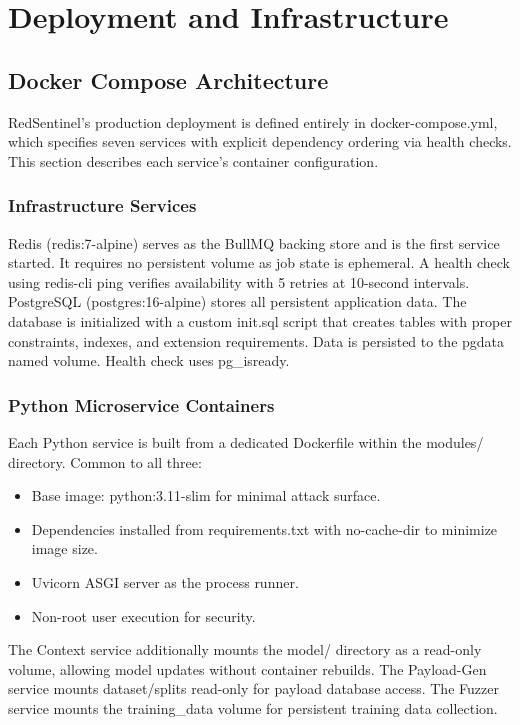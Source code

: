 \chapter{Deployment and Infrastructure}

\section{Docker Compose Architecture}
RedSentinel's production deployment is defined entirely in docker-compose.yml, which specifies seven services with explicit dependency ordering via health checks. This section describes each service's container configuration.
\subsection{Infrastructure Services}
Redis (redis:7-alpine) serves as the BullMQ backing store and is the first service started. It requires no persistent volume as job state is ephemeral. A health check using redis-cli ping verifies availability with 5 retries at 10-second intervals. PostgreSQL (postgres:16-alpine) stores all persistent application data. The database is initialized with a custom init.sql script that creates tables with proper constraints, indexes, and extension requirements. Data is persisted to the pgdata named volume. Health check uses pg\_\allowbreak isready.
\subsection{Python Microservice Containers}
Each Python service is built from a dedicated Dockerfile within the modules/ directory. Common to all three:
\begin{itemize}[itemsep=2pt, topsep=-15pt]
    \item Base image: python:3.11-slim for minimal attack surface.
    \item Dependencies installed from requirements.txt with no-cache-dir to minimize image size.
    \item Uvicorn ASGI server as the process runner.
    \item Non-root user execution for security.
\end{itemize}
The Context service additionally mounts the model/ directory as a read-only volume, allowing model updates without container rebuilds. The Payload-Gen service mounts dataset/splits read-only for payload database access. The Fuzzer service mounts the training\_\allowbreak data volume for persistent training data collection.
